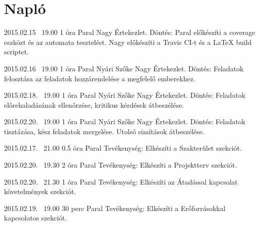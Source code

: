 %
\section{Napló}

\begin{naplo}

\bejegyzes
{2015.02.15 ~19.00}
{1 óra}
{Paral \newline Nagy} 
{Értekezlet.
Döntés: Paral előkészíti a coverage eszközt és az automata tesztelést. \newline
Nagy előkészíti a Travis CI-t és a LaTeX build scriptet.} 

\bejegyzes
{2015.02.16 ~19.00}
{1 óra}
{Paral \newline Nyári \newline Szőke \newline Nagy} 
{Értekezlet.
Döntés: Feladatok felosztása az feladatok hozzárendelése a megfelelő emberekhez. \newline } 

\bejegyzes
{2015.02.18. ~19.00}
{1 óra}
{Paral \newline Nyári \newline Szőke \newline Nagy} 
{Értekezlet.
Döntés: Feladatok előrehaladásának ellenőrzése, kritikus kérdések átbeszélése. \newline } 

\bejegyzes
{2015.02.20. ~19.00}
{1 óra}
{Paral \newline Nyári \newline Szőke \newline Nagy} 
{Értekezlet.
Döntés: Feladatok tisztázása, kész feladatok mergelése. Utolsó simítások átbeszélése. \newline } 

\bejegyzes
{2015.02.17. ~21.00}
{0.5 óra}
{Paral} 
{Tevékenység: Elkészíti a Szakterület szekciót.\newline } 

\bejegyzes
{2015.02.20. ~19.30}
{2 óra}
{Paral} 
{Tevékenység: Elkészíti a Projektterv szekciót.\newline } 

\bejegyzes
{2015.02.20. ~21.30}
{1 óra}
{Paral} 
{Tevékenység: Elkészíti az Átadással kapcsolat követelmények szekciót.\newline } 

\bejegyzes
{2015.02.19. ~19.00}
{30 perc}
{Paral} 
{Tevékenység: Elkészíti a Erőforrásokkal kapcsolatos szekciót.\newline } 


\end{naplo}
